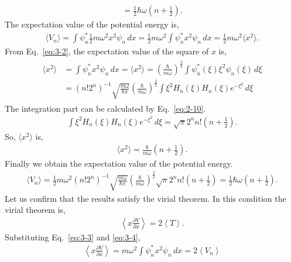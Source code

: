 \documentclass[floatfix,nofootinbib,superscriptaddress,fleqn]{revtex4-2}
\begin{document}
\begin{itemize}
\begin{align}
    =\frac{1}{2}\hbar \omega\left( n+\frac{1}{2} \right).
  \end{align}
  The expectation value of the potential energy is,
  \begin{align}
    \langle V_n\rangle = \int \psi^*_n \frac{1}{2}m\omega^2x^2 \psi_n \,dx
    =\frac{1}{2}m\omega^2\int \psi^*_n x^2 \psi_n \,dx
    =\frac{1}{2}m\omega^2\langle x^2\rangle.
  \end{align}
  From Eq.~\eqref{eq:3-2}, the expectation value of the square of $x$ is,
  \begin{align}
    \begin{split}
      \langle x^2\rangle &= \int \psi^*_n x^2 \psi_n \,dx
      =\langle x^2\rangle ={\left(\frac{\hbar}{m\omega}\right)}^{\frac{3}{2}} 
      \int \psi^*_n(\xi) \xi^2 \psi_n(\xi) \,d\xi \\
      &= (n!2^n)^{-1}\sqrt{\frac{m\omega}{\hbar\pi}}
      {\left(\frac{\hbar}{m\omega}\right)}^{\frac{3}{2}} 
      \int \xi^2 H_n(\xi) H_n(\xi) e^{-\xi^2}\,d\xi
    \end{split}    
  \end{align}
  The integration part can be calculated by Eq.~\eqref{eq:2-10}.
  \begin{align}
    \int \xi^2 H_n(\xi) H_n(\xi) e^{-\xi^2}\,d\xi
    =\sqrt{\pi}2^nn!\left( n+\frac{1}{2} \right).
  \end{align}
  So, $\langle x^2\rangle$ is,
  \begin{align}\label{eq:3-xs}
    \langle x^2\rangle = 
    \frac{\hbar}{m\omega}
    \left( n+\frac{1}{2}\right).
  \end{align}
  Finally we obtain the expectation value of the potential energy.
  \begin{align}\label{eq:3-4}
    \langle V_n\rangle=\frac{1}{2}m\omega^2(n!2^n)^{-1}
    \sqrt{\frac{m\omega}{\hbar\pi}}
    {\left(\frac{\hbar}{m\omega}\right)}^{\frac{3}{2}} 
    \sqrt{\pi}2^nn!\left( n+\frac{1}{2} \right)
    =\frac{1}{2}\hbar\omega
    \left( n+\frac{1}{2} \right).
  \end{align}
  Let us confirm that the results satisfy the virial theorem. 
  In this condition the virial theorem is,
  \begin{align}
    \left\langle x\frac{\partial V}{\partial x}\right\rangle 
    = 2\left\langle T\right\rangle .
  \end{align}
  Substituting Eq.~\eqref{eq:3-3} and \eqref{eq:3-4},
  \begin{align}
  \left\langle x\frac{\partial V}{\partial x}\right\rangle 
  =m\omega^2\int\psi^*_nx^2\psi_n\,dx = 2\left\langle V_n\right\rangle 

\end{align}
\end{itemize}
\end{document}
